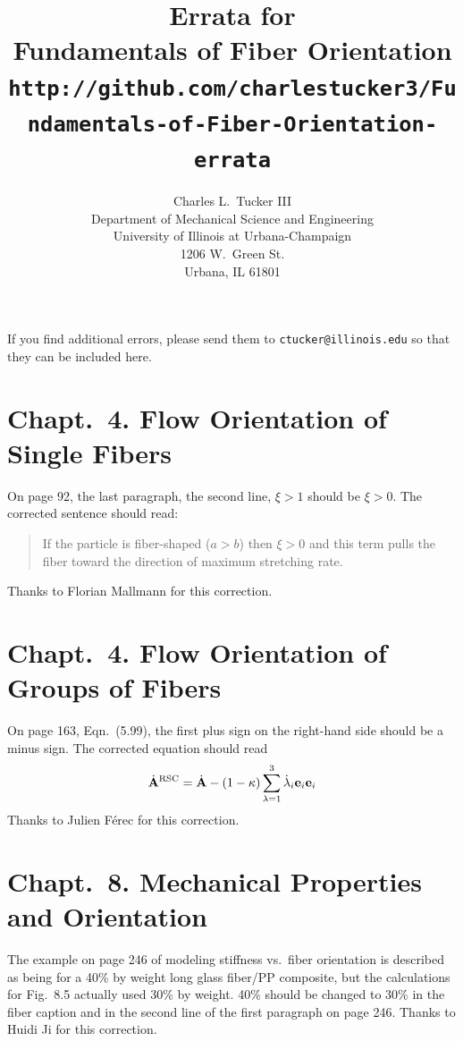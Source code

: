 \documentclass[11pt]{article}
\title{Errata for \\
      \textbf{Fundamentals of Fiber Orientation} \\
      { \normalsize \texttt{http://github.com/charlestucker3/Fundamentals-of-Fiber-Orientation-errata}} }
\author{Charles L.~Tucker III \\
       Department of Mechanical Science and Engineering \\
        University of Illinois at Urbana-Champaign \\
        1206 W.~Green St. \\
        Urbana, IL 61801 \\
        }
\begin{document}
\maketitle

If you find additional errors, please send them to \texttt{ctucker@illinois.edu} so that they can be included here.

\section*{Chapt.\ 4. Flow Orientation of Single Fibers}

On page 92, the last paragraph, the second line, $\xi > 1$ should be $\xi > 0$.  The corrected sentence should read:
\begin{quote}
If the particle is fiber-shaped ($a > b$) then $\xi > 0$ and this term pulls the fiber toward the direction of maximum stretching rate.
\end{quote}
Thanks to Florian Mallmann for this correction.

\section*{Chapt.\ 4. Flow Orientation of Groups of Fibers}

On page 163, Eqn.~(5.99), the first plus sign on the right-hand side should be a minus sign.  The corrected equation should read
\begin{equation*}
    \dot{\mathbf{A}}^\text{RSC} = \dot{\mathbf{A}} - (1 - \kappa) \sum_{\lambda = 1}^3 \dot{\lambda}_i \mathbf{e}_i \mathbf{e}_i
\end{equation*}
Thanks to Julien F\'erec for this correction.

\section*{Chapt.\ 8. Mechanical Properties and Orientation}

The example on page 246 of modeling stiffness vs.~fiber orientation is described as being for a 40\% by weight long glass fiber/PP composite, but the calculations for Fig.~8.5 actually used 30\% by weight.  40\% should be changed to 30\% in the fiber caption and in the second line of the first paragraph on page 246.  Thanks to Huidi Ji for this correction.
\end{document}
